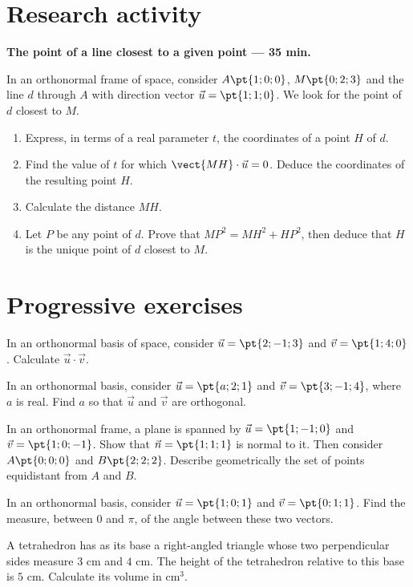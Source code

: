 \mxnewpage
\section{Research activity}\textbf{The point of a line closest to a given point --- 35 min.}\par In an orthonormal frame of space, consider $A\pt{1;0;0}$, $M\pt{0;2;3}$ and the line $d$ through $A$ with direction vector $\vec u=\pt{1;1;0}$. We look for the point of $d$ closest to $M$.
\begin{enumerate}\item Express, in terms of a real parameter $t$, the coordinates of a point $H$ of $d$.
\item Find the value of $t$ for which $\vect{MH}\cdot\vec u=0$. Deduce the coordinates of the resulting point $H$.
\item Calculate the distance $MH$.
\item Let $P$ be any point of $d$. Prove that $MP^2=MH^2+HP^2$, then deduce that $H$ is the unique point of $d$ closest to $M$.\end{enumerate}

\mxnewpage
\section{Progressive exercises}

In an orthonormal basis of space, consider $\vec u=\pt{2;-1;3}$ and $\vec v=\pt{1;4;0}$. Calculate $\vec u\cdot\vec v$.

In an orthonormal basis, consider $\vec u=\pt{a;2;1}$ and $\vec v=\pt{3;-1;4}$, where $a$ is real. Find $a$ so that $\vec u$ and $\vec v$ are orthogonal.

In an orthonormal frame, a plane is spanned by $\vec u=\pt{1;-1;0}$ and $\vec v=\pt{1;0;-1}$. Show that $\vec n=\pt{1;1;1}$ is normal to it. Then consider $A\pt{0;0;0}$ and $B\pt{2;2;2}$. Describe geometrically the set of points equidistant from $A$ and $B$.

In an orthonormal basis, consider $\vec u=\pt{1;0;1}$ and $\vec v=\pt{0;1;1}$. Find the measure, between $0$ and $\pi$, of the angle between these two vectors.

A tetrahedron has as its base a right-angled triangle whose two perpendicular sides measure $3$ cm and $4$ cm. The height of the tetrahedron relative to this base is $5$ cm. Calculate its volume in $\mathrm{cm}^3$.

